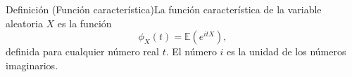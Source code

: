 \begin{frame}{}
\hypertarget{dfn:FuncionCaracteristica}{}
\begin{block}{Definici\'on (Funci\'on caracter\'istica)}La funci\'on caracter\'istica de
	la variable aleatoria $X$ es la funci\'on
	$$\phi_{X}(t)= \mathbb{E}\left( e^{itX}\right),$$
	definida para cualquier n\'umero real $t$. El n\'umero $i$ es la unidad de los n\'umeros 	imaginarios.
\end{block}
\hyperlink{cns:Limite}{}
\end{frame}
